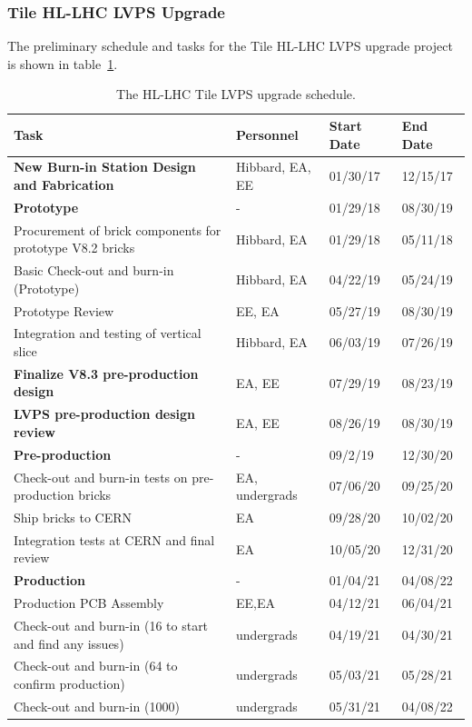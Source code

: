 \documentclass[11pt]{article}
\newcommand{\rowgroup}[1]{\hspace{-1em}#1}
\begin{document}
\subsubsection{Tile HL-LHC LVPS Upgrade}
The preliminary schedule and tasks for the Tile HL-LHC LVPS upgrade project is shown in table~\ref{tab:lvps}.
\begin{table}[htb]
\begin{center}
\begin{tabular}{       l  |l |l | l                } \\ 
\rowgroup{\textbf{Task} }& \textbf{Personnel} &\textbf{Start Date} & \textbf{End Date}   \\ \hline\hline
\rowgroup{\textbf{New Burn-in Station Design and Fabrication}}   & Hibbard, EA, EE&  01/30/17   &  12/15/17  \\ \hline  
\rowgroup{\textbf{Prototype}}                                   &  - &01/29/18    & 08/30/19 \\ \hline
Procurement of brick components for prototype V8.2 bricks   &  Hibbard, EA &01/29/18 & 05/11/18  \\ 
Basic Check-out and burn-in (Prototype) & Hibbard, EA &  04/22/19   &  05/24/19 \\  
Prototype Review   & EE, EA & 05/27/19   &  08/30/19   \\
Integration and testing of vertical slice   &  Hibbard, EA &06/03/19   &  07/26/19  \\ \hline
\rowgroup{\textbf{Finalize  V8.3 pre-production design} }  & EA, EE & 07/29/19  & 08/23/19 \\ \hline
\rowgroup{\textbf{LVPS pre-production design review}}   &  EA, EE & 08/26/19   &  08/30/19 \\  \hline 
\rowgroup{\textbf{Pre-production}}   & - & 09/2/19    & 12/30/20   \\ \hline 
  Check-out and burn-in tests on pre-production bricks & EA, undergrads  &  07/06/20   &  09/25/20 \\ 
  Ship bricks to CERN   & EA & 09/28/20 & 10/02/20  \\
  Integration tests at CERN and final review   & EA & 10/05/20   &  12/31/20 \\ \hline
\rowgroup\textbf{{Production}  } &  - & 01/04/21 &   04/08/22  \\ \hline

  Production PCB Assembly   &  EE,EA & 04/12/21   &  06/04/21  \\ 
  Check-out and burn-in (16 to start and find any issues)  & undergrads   &   04/19/21   &  04/30/21 \\  
  Check-out and burn-in (64 to confirm production) & undergrads  &  05/03/21   &  05/28/21 \\  
  Check-out and burn-in (1000)   & undergrads  & 05/31/21   &  04/08/22  \\  \hline
\end{tabular}
\caption{ The HL-LHC Tile LVPS upgrade schedule.}
\label{tab:lvps}
\end{center}
\end{table}
\end{document}
